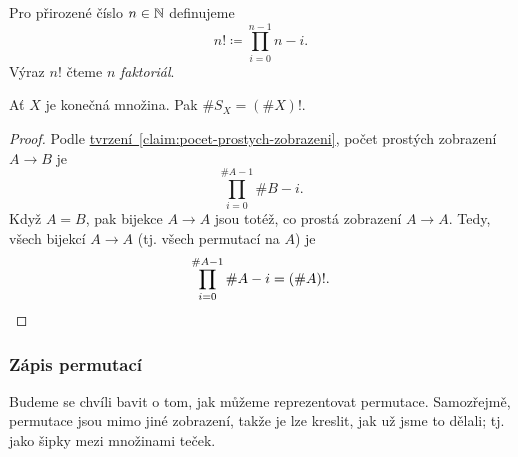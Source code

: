 \begin{definition}[Faktoriál]
\label{def:faktorial}
 Pro přirozené číslo $n \in \mathbb{N}$ definujeme
 \[
  n! \coloneqq \prod_{i=0}^{n-1} n-i. 
 \]
 Výraz $n!$ čteme $n$ \emph{faktoriál}.
\end{definition}

\begin{claim}
\label{prop:pocet-permutaci-na-mnozine}
 Ať $X$ je konečná množina. Pak $\# S_X = (\# X)!$.
\end{claim}

\begin{proof}
 Podle
 \hyperref[claim:pocet-prostych-zobrazeni]{tvrzení~\ref{claim:pocet-prostych-zobrazeni}},
 počet prostých zobrazení $A \to B$ je
 \[
  \prod_{i=0}^{\# A-1} \# B - i.  
 \]
 Když $A = B$, pak bijekce $A \to A$ jsou totéž, co prostá zobrazení $A \to A$.
 Tedy, všech bijekcí $A \to A$ (tj. všech permutací na $A$) je
 \[
  \prod_{i=0}^{\# A-1} \# A - i = (\# A)!.\qedhere 
 \]
\end{proof}

\subsubsection{Zápis permutací}
\label{sssec:zapis-permutaci}

Budeme se chvíli bavit o tom, jak můžeme reprezentovat permutace. Samozřejmě,
permutace jsou mimo jiné zobrazení, takže je lze kreslit, jak už jsme to dělali;
tj. jako šipky mezi množinami teček.

